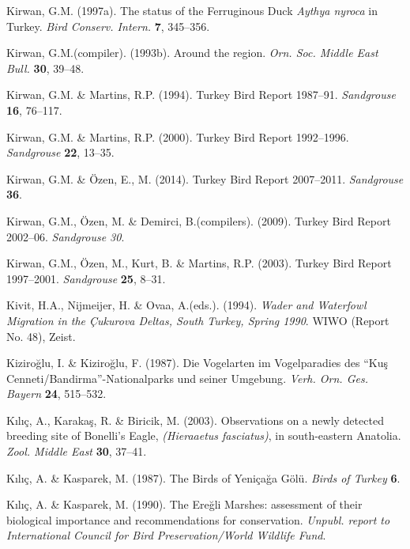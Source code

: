 \documentclass[
  a4paper,
  DIV=11,
  numbers=noendperiod]{scrreprt}
\newlength{\cslhangindent}
\newenvironment{CSLReferences}[2] %
 {\begin{list}{}{%
  \setlength{\itemindent}{0pt}
  \setlength{\leftmargin}{0pt}
  \setlength{\parsep}{0pt}
  \ifodd #1
   \setlength{\leftmargin}{\cslhangindent}
   \setlength{\itemindent}{-1\cslhangindent}
  \fi
  \setlength{\itemsep}{#2\baselineskip}}}
 {\end{list}}
\begin{document}
\begin{CSLReferences}{1}{1}
Kirwan, G.M. (1997a). {The status of the Ferruginous Duck \emph{Aythya
nyroca} in Turkey}. \emph{Bird Conserv. Intern.} \textbf{7}, 345--356.

Kirwan, G.M.(compiler). (1993b). {Around the region}. \emph{Orn. Soc.
Middle East Bull.} \textbf{30}, 39--48.

Kirwan, G.M. \& Martins, R.P. (1994). {Turkey Bird Report 1987--91}.
\emph{Sandgrouse} \textbf{16}, 76--117.

Kirwan, G.M. \& Martins, R.P. (2000). {Turkey Bird Report 1992--1996}.
\emph{Sandgrouse} \textbf{22}, 13--35.

Kirwan, G.M. \& Özen, E., M. (2014). {Turkey Bird Report 2007--2011}.
\emph{Sandgrouse} \textbf{36}.

Kirwan, G.M., Özen, M. \& Demirci, B.(compilers). (2009). {Turkey Bird
Report 2002--06}. \emph{Sandgrouse 30}.

Kirwan, G.M., Özen, M., Kurt, B. \& Martins, R.P. (2003). {Turkey Bird
Report 1997--2001}. \emph{Sandgrouse} \textbf{25}, 8--31.

Kivit, H.A., Nijmeijer, H. \& Ovaa, A.(eds.). (1994). \emph{{Wader and
Waterfowl Migration in the Çukurova Deltas, South Turkey, Spring 1990}}.
WIWO (Report No. 48), Zeist.

Kiziroğlu, I. \& Kiziroğlu, F. (1987). {Die Vogelarten im Vogelparadies
des {``Kuş Cenneti/Bandirma''}-Nationalparks und seiner Umgebung}.
\emph{Verh. Orn. Ges. Bayern} \textbf{24}, 515--532.

Kılıç, A., Karakaş, R. \& Biricik, M. (2003). {Observations on a newly
detected breeding site of Bonelli's Eagle, \emph{(Hieraaetus
fasciatus)}, in south-eastern Anatolia}. \emph{Zool. Middle East}
\textbf{30}, 37--41.

Kılıç, A. \& Kasparek, M. (1987). {The Birds of Yeniçağa Gölü}.
\emph{Birds of Turkey} \textbf{6}.

Kılıç, A. \& Kasparek, M. (1990). {The Ereğli Marshes: assessment of
their biological importance and recommendations for conservation}.
\emph{Unpubl. report to International Council for Bird
Preservation/World Wildlife Fund}.


\end{CSLReferences}
\end{document}
